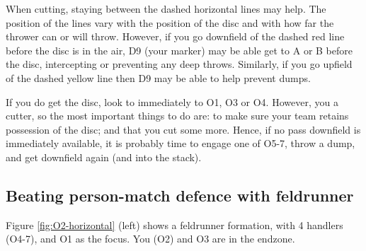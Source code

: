 \documentclass{tufte-handout}
\begin{document}
When cutting,
staying  
between 
the dashed 
horizontal 
lines 
may help. 
The position of 
the lines vary
with the position of the disc
and with how far the thrower  
can or will 
throw. 
However, 
if you go 
downfield of the dashed red line 
before the disc is in the air,
D9 (your marker) 
may be able 
get to
A or B 
before the disc,
intercepting 
or preventing 
any deep throws. 
Similarly, 
if you go 
upfield of the dashed yellow line
then D9 may 
be able to help
prevent dumps.

If you do get the disc,
look to immediately  
to O1, 
O3 
or O4. 
However, 
you a cutter, 
so the most 
important things to do are:
to make sure your team 
retains possession of the disc; and
that you cut some more. 
Hence, 
if no pass downfield 
is immediately available, 
it is probably time to engage 
one of O5-7, 
throw a dump, 
and get downfield again 
(and into the stack).


\subsection{Beating person-match defence with feldrunner}
\label{sec:feld}
Figure \ref{fig:O2-horizontal} (left) 
shows a feldrunner formation, 
with 4 handlers (O4-7), 
and O1 as the focus.
You  
(O2) 
and O3
are in the endzone.
\end{document}

